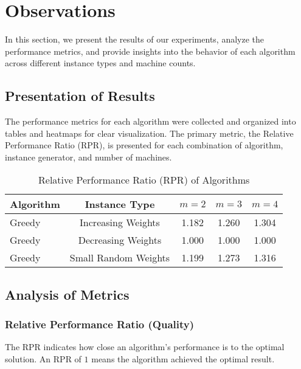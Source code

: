 \section{Observations}

In this section, we present the results of our experiments, analyze the performance metrics, and provide insights into the behavior of each algorithm across different instance types and machine counts.

\subsection*{Presentation of Results}

The performance metrics for each algorithm were collected and organized into tables and heatmaps for clear visualization. The primary metric, the Relative Performance Ratio (RPR), is presented for each combination of algorithm, instance generator, and number of machines.

\begin{table}[H]
    \centering
    \caption{Relative Performance Ratio (RPR) of Algorithms}
    \begin{tabular}{lcccc}
        \hline
        \textbf{Algorithm} & \textbf{Instance Type} & \textbf{$m=2$} & \textbf{$m=3$} & \textbf{$m=4$} \\
        \hline
        Greedy             & Increasing Weights     & 1.182          & 1.260          & 1.304          \\
        Greedy             & Decreasing Weights     & 1.000          & 1.000          & 1.000          \\
        Greedy             & Small Random Weights   & 1.199          & 1.273          & 1.316          \\
        \hline
    \end{tabular}
    \label{tab:rpr}
\end{table}

\subsection*{Analysis of Metrics}

\subsubsection*{Relative Performance Ratio (Quality)}

The RPR indicates how close an algorithm's performance is to the optimal solution. An RPR of $1$ means the algorithm achieved the optimal result.

